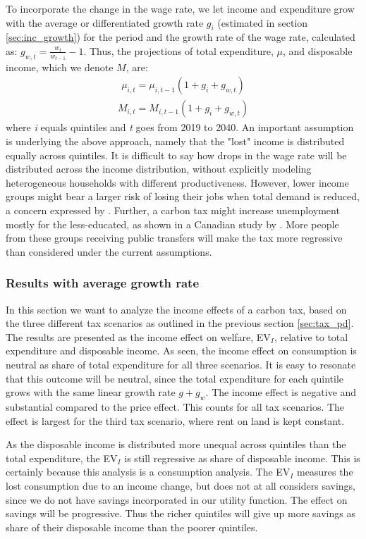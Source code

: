  To incorporate the change in the wage rate, we let income and expenditure grow with the average or differentiated growth rate $g_i$ (estimated in section \ref{sec:inc_growth}) for the period and the growth rate of the wage rate, calculated as: $g_{w,t} = \frac{w_t}{w_{t-1}}-1$. Thus, the projections of total expenditure, $\mu$, and disposable income, which we denote $M$, are:
 \begin{align}
    \mu_{i,t} = \mu_{i,t-1}(1+g_i+g_{w,t})
\end{align}
 \begin{align}
    M_{i,t} = M_{i,t-1}(1+g_i+g_{w,t})
\end{align}
where \textit{i} equals quintiles and \textit{t} goes from 2019 to 2040. An important assumption is underlying the above approach, namely that the "lost" income is distributed equally across quintiles. It is difficult to say how drops in the wage rate will be distributed across the income distribution, without explicitly modeling heterogeneous households with different productiveness. However, lower income groups might bear a larger risk of losing their jobs when total demand is reduced, a concern expressed by \cite{sune2020}. Further, a carbon tax might increase unemployment mostly for the less-educated, as shown in a Canadian study by \cite{YIP2018136}. More people from these groups receiving public transfers will make the tax more regressive than considered under the current assumptions. 

\subsubsection{Results with average growth rate}
In this section we want to analyze the income effects of a carbon tax, based on the three different tax scenarios as outlined in the previous section \ref{sec:tax_pd}. The results are presented as the income effect on welfare, EV$_I$, relative to total expenditure and disposable income. As seen, the income effect on consumption is neutral as share of total expenditure for all three scenarios. It is easy to resonate that this outcome will be neutral, since the total expenditure for each quintile grows with the same linear growth rate $g+g_w$. 
The income effect is negative and substantial compared to the price effect. This counts for all tax scenarios. The effect is largest for the third tax scenario, where rent on land is kept constant.

As the disposable income is distributed more unequal across quintiles than the total expenditure, the EV$_I$ is still regressive as share of disposable income. This is certainly because this analysis is a consumption analysis. The EV$_I$ measures the lost consumption due to an income change, but does not at all considers savings, since we do not have savings incorporated in our utility function. The effect on savings will be progressive. Thus the richer quintiles will give up more savings as share of their disposable income than the poorer quintiles.

